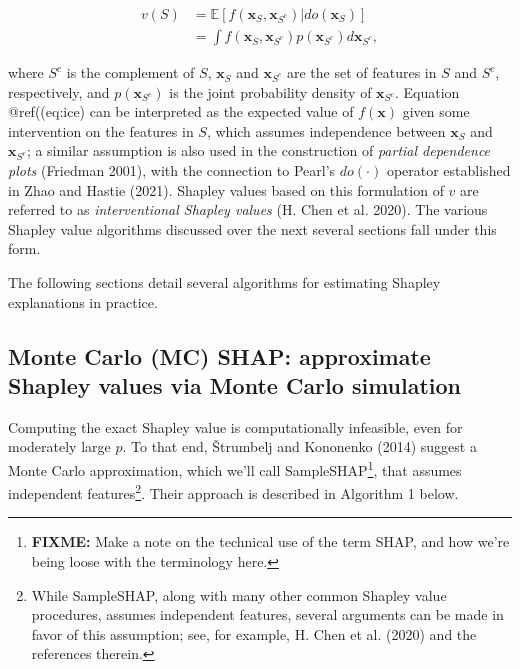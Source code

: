 \begin{equation}
\begin{split}
  v\left(S\right) &= \mathbb{E}\left[f\left(\boldsymbol{x}_S, \boldsymbol{x}_{S^c}\right) | do\left(\boldsymbol{x}_S\right)\right] \\
                  &= \int f\left(\boldsymbol{x}_S, \boldsymbol{x}_{S^c}\right) p\left(\boldsymbol{x}_{S^c}\right) d \boldsymbol{x}_{S^c},
\end{split}
  \label{eq:ice}
\end{equation}

where \(S^c\) is the complement of \(S\), \(\boldsymbol{x}_S\) and \(\boldsymbol{x}_{S^c}\) are the set of features in \(S\) and \(S^c\), respectively, and \(p\left(\boldsymbol{x}_{S^c}\right)\) is the joint probability density of \(\boldsymbol{x}_{S^c}\). Equation @ref((eq:ice) can be interpreted as the expected value of \(f\left(\boldsymbol{x}\right)\) given some intervention on the features in \(S\), which assumes independence between \(\boldsymbol{x}_S\) and \(\boldsymbol{x}_{S^c}\); a similar assumption is also used in the construction of \emph{partial dependence plots} (Friedman 2001), with the connection to Pearl's \(do\left(\cdot\right)\) operator established in Zhao and Hastie (2021). Shapley values based on this formulation of \(v\) are referred to as \emph{interventional Shapley values} (H. Chen et al. 2020). The various Shapley value algorithms discussed over the next several sections fall under this form.

The following sections detail several algorithms for estimating Shapley explanations in practice.

\hypertarget{monte-carlo-mc-shap-approximate-shapley-values-via-monte-carlo-simulation}{%
\subsection{Monte Carlo (MC) SHAP: approximate Shapley values via Monte Carlo simulation}\label{monte-carlo-mc-shap-approximate-shapley-values-via-monte-carlo-simulation}}

Computing the exact Shapley value is computationally infeasible, even for moderately large \(p\). To that end, Štrumbelj and Kononenko (2014) suggest a Monte Carlo approximation, which we'll call SampleSHAP\footnote{\textbf{FIXME:} Make a note on the technical use of the term SHAP, and how we're being loose with the terminology here.}, that assumes independent features\footnote{While SampleSHAP, along with many other common Shapley value procedures, assumes independent features, several arguments can be made in favor of this assumption; see, for example, H. Chen et al. (2020) and the references therein.}. Their approach is described in Algorithm 1 below.

